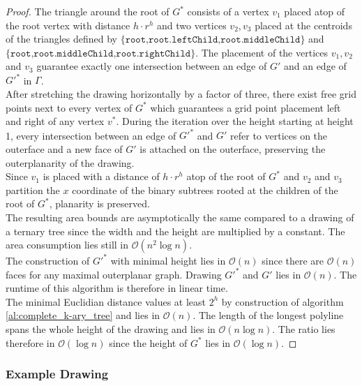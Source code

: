 \begin{proof}
	The triangle around the root of $G^*$ consists of a vertex $v_1$ placed atop of the root vertex with distance $h\cdot r^h$ and two vertices $v_2,v_3$ placed at the centroids of the triangles defined by $\{\texttt{root,root.leftChild,root.middleChild}\}$ and $\{\texttt{root,root.middleChild,root.rightChild}\}$. The placement of the vertices $v_1,v_2$ and $v_3$ guarantee exactly one intersection between an edge of $G'$ and an edge of $G'^*$ in $\Gamma$.\\
	After stretching the drawing horizontally by a factor of three, there exist free grid points next to every vertex of $G^*$ which guarantees a grid point placement left and right of any vertex $v^*$. During the iteration over the height starting at height 1, every intersection between an edge of $G'^*$ and $G'$ refer to vertices on the outerface and a new face of $G'$ is attached on the outerface, preserving the outerplanarity of the drawing.\\
	Since $v_1$ is placed with a distance of $h\cdot r^h$ atop of the root of $G^*$ and $v_2$ and $v_3$ partition the $x$ coordinate of the binary subtrees rooted at the children of the root of $G^*$, planarity is preserved.\\
	The resulting area bounds are asymptotically the same compared to a drawing of a ternary tree since the width and the height are multiplied by a constant. The area consumption lies still in $\mathcal{O}(n^2 \log n)$.\\
	The construction of $G'^*$ with minimal height lies in $\mathcal{O}(n)$ since there are $\mathcal{O}(n)$ faces for any maximal outerplanar graph. Drawing $G'^*$ and $G'$ lies in $\mathcal{O}(n)$. The runtime of this algorithm is therefore in linear time.\\
	The minimal Euclidian distance values at least $2^h$ by construction of algorithm  \ref{al:complete_k-ary_tree} and lies in $\mathcal{O}(n)$. The length of the longest polyline spans the whole height of the drawing and lies in $\mathcal{O}(n \log n)$. The ratio lies therefore in $\mathcal{O}(\log n)$ since the height of $G^*$ lies in $\mathcal{O}(\log n)$.
\end{proof}
\subsubsection{Example Drawing}

